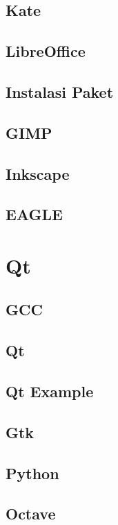\documentclass[11pt,fleqn]{book} %
\begin{document}
\section{Kate}
\section{LibreOffice}
\section{Instalasi Paket}
\section{GIMP}
\section{Inkscape}
\section{EAGLE}

\newpage
{} %
\chapter{Qt}
\section{GCC}
\section{Qt}
\section{Qt Example}
\section{Gtk}
\section{Python}
\section{Octave}
\end{document}
